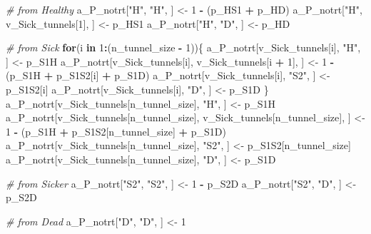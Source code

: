 \documentclass[
]{article}
\newenvironment{Shaded}{\begin{snugshade}}{\end{snugshade}}
\newcommand{\CommentTok}[1]{\textcolor[rgb]{0.56,0.35,0.01}{\textit{#1}}}
\newcommand{\ControlFlowTok}[1]{\textcolor[rgb]{0.13,0.29,0.53}{\textbf{#1}}}
\newcommand{\DecValTok}[1]{\textcolor[rgb]{0.00,0.00,0.81}{#1}}
\newcommand{\NormalTok}[1]{#1}
\newcommand{\OperatorTok}[1]{\textcolor[rgb]{0.81,0.36,0.00}{\textbf{#1}}}
\newcommand{\StringTok}[1]{\textcolor[rgb]{0.31,0.60,0.02}{#1}}
\begin{document}
\begin{Shaded}
\begin{Highlighting}[]
\CommentTok{# from Healthy}
\NormalTok{a_P_notrt[}\StringTok{"H"}\NormalTok{, }\StringTok{"H"}\NormalTok{, ]               <-}\StringTok{ }\DecValTok{1} \OperatorTok{-}\StringTok{ }\NormalTok{(p_HS1 }\OperatorTok{+}\StringTok{ }\NormalTok{p_HD)}
\NormalTok{a_P_notrt[}\StringTok{"H"}\NormalTok{, v_Sick_tunnels[}\DecValTok{1}\NormalTok{], ] <-}\StringTok{ }\NormalTok{p_HS1}
\NormalTok{a_P_notrt[}\StringTok{"H"}\NormalTok{, }\StringTok{"D"}\NormalTok{, ]               <-}\StringTok{ }\NormalTok{p_HD}

\CommentTok{# from Sick}
\ControlFlowTok{for}\NormalTok{(i }\ControlFlowTok{in} \DecValTok{1}\OperatorTok{:}\NormalTok{(n_tunnel_size }\OperatorTok{-}\StringTok{ }\DecValTok{1}\NormalTok{))\{}
\NormalTok{  a_P_notrt[v_Sick_tunnels[i], }\StringTok{"H"}\NormalTok{, ]  <-}\StringTok{ }\NormalTok{p_S1H}
\NormalTok{  a_P_notrt[v_Sick_tunnels[i], v_Sick_tunnels[i }\OperatorTok{+}\StringTok{ }\DecValTok{1}\NormalTok{], ] <-}\StringTok{ }\DecValTok{1} \OperatorTok{-}\StringTok{ }\NormalTok{(p_S1H }\OperatorTok{+}\StringTok{ }\NormalTok{p_S1S2[i] }\OperatorTok{+}\StringTok{ }\NormalTok{p_S1D)}
\NormalTok{  a_P_notrt[v_Sick_tunnels[i], }\StringTok{"S2"}\NormalTok{, ] <-}\StringTok{ }\NormalTok{p_S1S2[i]}
\NormalTok{  a_P_notrt[v_Sick_tunnels[i], }\StringTok{"D"}\NormalTok{, ]  <-}\StringTok{ }\NormalTok{p_S1D}
\NormalTok{\}}
\NormalTok{a_P_notrt[v_Sick_tunnels[n_tunnel_size], }\StringTok{"H"}\NormalTok{, ]  <-}\StringTok{ }\NormalTok{p_S1H}
\NormalTok{a_P_notrt[v_Sick_tunnels[n_tunnel_size], v_Sick_tunnels[n_tunnel_size], ] <-}\StringTok{ }\DecValTok{1} \OperatorTok{-}\StringTok{ }
\StringTok{         }\NormalTok{(p_S1H }\OperatorTok{+}\StringTok{ }\NormalTok{p_S1S2[n_tunnel_size] }\OperatorTok{+}\StringTok{ }\NormalTok{p_S1D)}
\NormalTok{a_P_notrt[v_Sick_tunnels[n_tunnel_size], }\StringTok{"S2"}\NormalTok{, ] <-}\StringTok{ }\NormalTok{p_S1S2[n_tunnel_size]}
\NormalTok{a_P_notrt[v_Sick_tunnels[n_tunnel_size], }\StringTok{"D"}\NormalTok{, ]  <-}\StringTok{ }\NormalTok{p_S1D}

\CommentTok{# from Sicker}
\NormalTok{a_P_notrt[}\StringTok{"S2"}\NormalTok{, }\StringTok{"S2"}\NormalTok{, ] <-}\StringTok{ }\DecValTok{1} \OperatorTok{-}\StringTok{ }\NormalTok{p_S2D}
\NormalTok{a_P_notrt[}\StringTok{"S2"}\NormalTok{, }\StringTok{"D"}\NormalTok{, ]  <-}\StringTok{ }\NormalTok{p_S2D}

\CommentTok{# from Dead}
\NormalTok{a_P_notrt[}\StringTok{"D"}\NormalTok{, }\StringTok{"D"}\NormalTok{, ]   <-}\StringTok{ }\DecValTok{1}


\end{Highlighting}
\end{Shaded}
\end{document}
